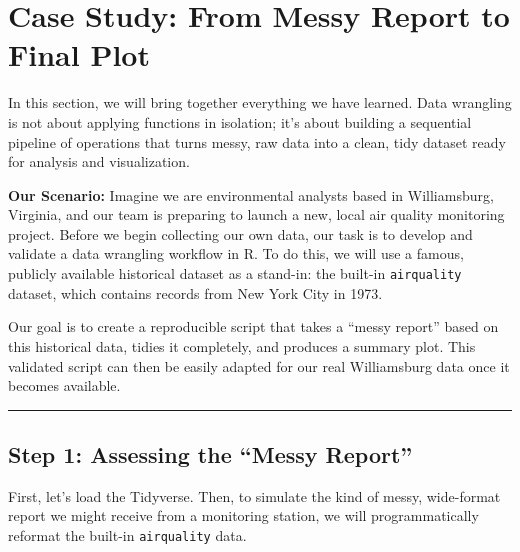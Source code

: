 \documentclass[
  11pt,
]{article}
\begin{document}
\section{Case Study: From Messy Report to Final
Plot}\label{case-study-from-messy-report-to-final-plot}

In this section, we will bring together everything we have learned. Data
wrangling is not about applying functions in isolation; it's about
building a sequential pipeline of operations that turns messy, raw data
into a clean, tidy dataset ready for analysis and visualization.

\textbf{Our Scenario:} Imagine we are environmental analysts based in
Williamsburg, Virginia, and our team is preparing to launch a new, local
air quality monitoring project. Before we begin collecting our own data,
our task is to develop and validate a data wrangling workflow in R. To
do this, we will use a famous, publicly available historical dataset as
a stand-in: the built-in \texttt{airquality} dataset, which contains
records from New York City in 1973.

Our goal is to create a reproducible script that takes a ``messy
report'' based on this historical data, tidies it completely, and
produces a summary plot. This validated script can then be easily
adapted for our real Williamsburg data once it becomes available.

\begin{center}\rule{0.5\linewidth}{0.5pt}\end{center}

\subsection{Step 1: Assessing the ``Messy
Report''}\label{step-1-assessing-the-messy-report}

First, let's load the Tidyverse. Then, to simulate the kind of messy,
wide-format report we might receive from a monitoring station, we will
programmatically reformat the built-in \texttt{airquality} data.
\end{document}
